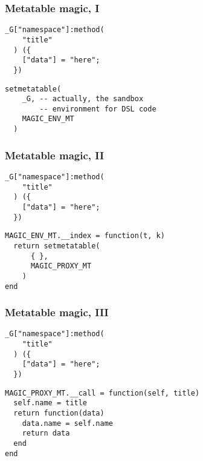 \documentclass[handout]{beamer}
\begin{document}

\begin{frame}[fragile]

\frametitle{Metatable magic, I}

\begin{verbatim}
_G["namespace"]:method(
    "title"
  ) ({
    ["data"] = "here";
  })
\end{verbatim}

\pause

\begin{verbatim}
setmetatable(
    _G, -- actually, the sandbox
        -- environment for DSL code
    MAGIC_ENV_MT
  )
\end{verbatim}

\end{frame}


\begin{frame}[fragile]

\frametitle{Metatable magic, II}

\begin{verbatim}
_G["namespace"]:method(
    "title"
  ) ({
    ["data"] = "here";
  })
\end{verbatim}

\begin{verbatim}
MAGIC_ENV_MT.__index = function(t, k)
  return setmetatable(
      { },
      MAGIC_PROXY_MT
    )
end
\end{verbatim}

\end{frame}


\begin{frame}[fragile]

\frametitle{Metatable magic, III}

\begin{verbatim}
_G["namespace"]:method(
    "title"
  ) ({
    ["data"] = "here";
  })
\end{verbatim}

\begin{verbatim}
MAGIC_PROXY_MT.__call = function(self, title)
  self.name = title
  return function(data)
    data.name = self.name
    return data
  end
end
\end{verbatim}

\end{frame}
\end{document}
